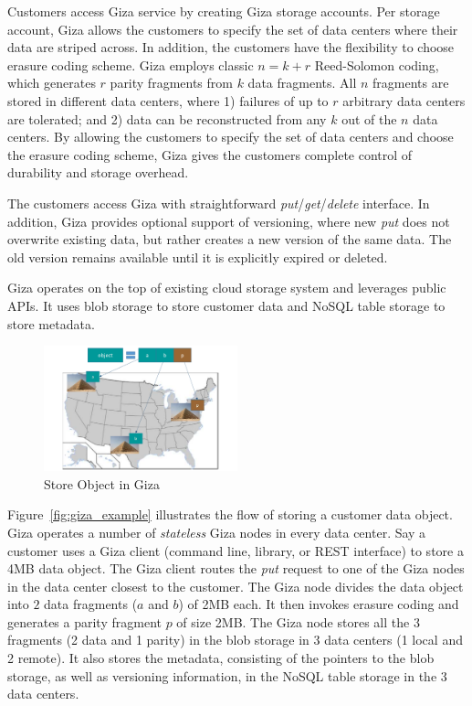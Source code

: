 Customers access Giza service by creating Giza storage accounts. Per storage account, Giza allows the customers to specify the set of data centers where their data are striped across. In addition, the customers have the flexibility to choose erasure coding scheme. Giza employs classic $n = k + r$ Reed-Solomon coding, which generates $r$ parity fragments from $k$ data fragments. All $n$ fragments are stored in different data centers, where 1) failures of up to $r$ arbitrary data centers are tolerated; and 2) data can be reconstructed from any $k$ out of the $n$ data centers. By allowing the customers to specify the set of data centers and choose the erasure coding scheme, Giza gives the customers complete control of durability and storage overhead.

The customers access Giza with straightforward {\em put}/{\em get}/{\em delete} interface. In addition, Giza provides optional support of versioning, where new {\em put} does not overwrite existing data, but rather creates a new version of the same data. The old version remains available until it is explicitly expired or deleted.

Giza operates on the top of existing cloud storage system and leverages public APIs. It uses blob storage to store customer data and NoSQL table storage to store metadata.

\begin{figure}[tp]
\centering
\includegraphics[width=0.5\textwidth]{images/giza_example_crop_fit}
\caption{Store Object in Giza}
\end{figure}

Figure~\ref{fig:giza_example} illustrates the flow of storing a customer data object. Giza operates a number of {\em stateless} Giza nodes in every data center. Say a customer uses a Giza client (command line, library, or REST interface) to store a 4MB data object. The Giza client routes the {\em put} request to one of the Giza nodes in the data center closest to the customer. The Giza node divides the data object into $2$ data fragments ($a$ and $b$) of 2MB each. It then invokes erasure coding and generates a parity fragment $p$ of size 2MB. The Giza node stores all the $3$ fragments (2 data and 1 parity) in the blob storage in 3 data centers (1 local and 2 remote). It also stores the metadata, consisting of the pointers to the blob storage, as well as versioning information, in the NoSQL table storage in the 3 data centers.

